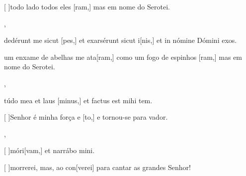 {        {\item {}[ ]{to}do lado todos eles [ram,] mas em nome do Serotei.},
    {\item {}dedérunt me sicut [pes,] et exarsérunt sicut i[nis,] et in nómine Dómini exos.}%
        {\item {} um enxame de abelhas me ata[ram,] como um fogo de espinhos [ram,] mas em nome do Serotei.},
    {\item {}túdo mea et laus [minus,] et factus est mihi tem.}%
        {\item {}[ ]{Se}nhor é minha força e [to,] e tornou-se para vador.},
    {\item {}[ ]{mó}ri[vam,] et narrábo mini.}%
        {\item {}[ ]{mor}rerei, mas, ao con[verei] para cantar as grandes  Senhor!}
}
